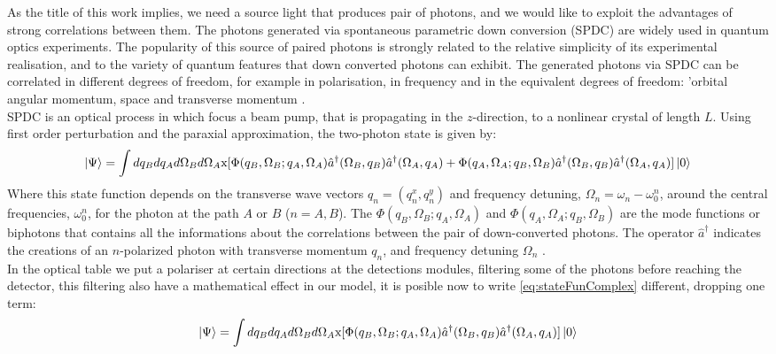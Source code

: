 As the title of this work implies, we need a source light that produces pair of photons, 
and we would like to exploit the advantages of strong correlations between them.
The photons generated via spontaneous parametric down conversion (SPDC) are
widely used in quantum optics experiments. The popularity of this source of paired
photons is strongly related to the relative simplicity of its experimental
realisation, and to the variety of quantum features that down converted photons can exhibit. 
The generated photons via SPDC can be correlated in different degrees of freedom, for example 
in polarisation, in frequency and in the equivalent degrees of freedom: 
'orbital angular momentum, space and transverse momentum \cite{spatiocorrelations}.\\

SPDC is an optical process in which focus a beam pump, that is 
propagating in the $z$-direction, to a nonlinear crystal of length $L$. Using first order perturbation 
and the paraxial approximation, the two-photon state is given by:
\begin{equation}
\label{eq:stateFunComplex}
\ket{\Psi}=\int dq_B dq_A d\Omega_B d\Omega_A 
\text{x} [\Phi(q_B,\Omega_B;q_A,\Omega_A) \hat{a}^{\dagger} (\Omega_B,q_B) \hat{a}^{\dagger}(\Omega_A,q_A) \\
+ \Phi(q_A,\Omega_A;q_B,\Omega_B) \hat{a}^{\dagger}(\Omega_B,q_B) \hat{a}^{\dagger}(\Omega_A,q_A)]   \ket{0}  
\end{equation}
Where this state function depends on the transverse wave vectors $q_n=(q_n^x,q_n^y)$ and frequency detuning, $\Omega_n=\omega_n-\omega_0^n$, 
around the central frequencies, $\omega_0^n$, for the photon at the path $A$ or $B$ ($n=A,B$).
The $\Phi(q_B,\Omega_B;q_A,\Omega_A)$ and $\Phi(q_A,\Omega_A;q_B,\Omega_B)$
are the mode functions or biphotons that contains all the informations about the correlations
between the pair of down-converted photons. The operator $\hat{a}^{\dagger}$ indicates the creations of an $n$-polarized photon with transverse momentum $q_n$, 
and frequency detuning $\Omega_n$ \cite{physicsGhost}. \\

In the optical table we put a polariser at certain directions at the detections modules,
filtering some of the photons before reaching the detector, this filtering also have a mathematical effect in our model, 
it is posible now to write \ref{eq:stateFunComplex} different, dropping one term:
\begin{equation}
\label{eq:stateFun}
\ket{\Psi}=\int dq_B dq_A d\Omega_B d\Omega_A 
\text{x} [\Phi(q_B,\Omega_B;q_A,\Omega_A) \hat{a}^{\dagger} (\Omega_B,q_B) \hat{a}^{\dagger}(\Omega_A,q_A) 
] \ket{0}  
\end{equation}

